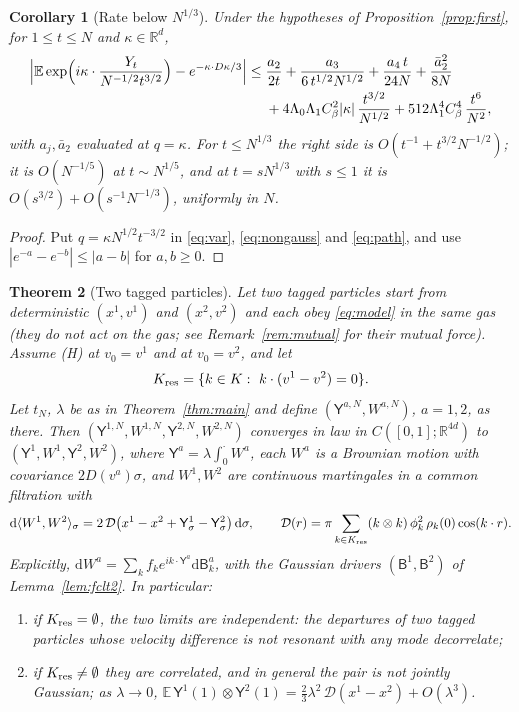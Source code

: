 \documentclass[11pt]{article}
\newcommand{\dd}{\mathrm{d}}
\newcommand{\E}{\mathbb{E}}
\newcommand{\R}{\mathbb{R}}
\newcommand{\sY}{\mathsf{Y}}
\newcommand{\sB}{\mathsf{B}}
\newtheorem{theorem}{Theorem}
\newtheorem{corollary}[theorem]{Corollary}
\theoremstyle{remark}
\begin{document}
\begin{corollary}[Rate below $N^{1/3}$]\label{cor:rate}
Under the hypotheses of Proposition~\ref{prop:first}, for $1\le t\le N$ and
$\kappa\in\R^d$,
\begin{align*}
  \Bigl|\E\exp\Bigl(i\kappa\cdot\frac{Y_t}{N^{-1/2}t^{3/2}}\Bigr)
  -e^{-\kappa\cdot D\kappa/3}\Bigr|
  \le{}& \frac{a_2}{2t}+\frac{a_3}{6\,t^{1/2}N^{1/2}}+\frac{a_4\,t}{24N}
  +\frac{\bar a_2^2}{8N}\\
  &+4\Lambda_0\Lambda_1C_\beta^2|\kappa|\,\frac{t^{3/2}}{N^{1/2}}
  +512\Lambda_1^4C_\beta^4\,\frac{t^6}{N^2},
\end{align*}
with $a_j,\bar a_2$ evaluated at $q=\kappa$. For $t\le N^{1/3}$ the right
side is $O(t^{-1}+t^{3/2}N^{-1/2})$; it is $O(N^{-1/5})$ at $t\sim N^{1/5}$,
and at $t=sN^{1/3}$ with $s\le1$ it is $O(s^{3/2})+O(s^{-1}N^{-1/3})$,
uniformly in $N$.
\end{corollary}

\begin{proof}
Put $q=\kappa N^{1/2}t^{-3/2}$ in \eqref{eq:var}, \eqref{eq:nongauss} and
\eqref{eq:path}, and use $|e^{-a}-e^{-b}|\le|a-b|$ for $a,b\ge0$.
\end{proof}

\begin{theorem}[Two tagged particles]\label{thm:two}
Let two tagged particles start from deterministic $(x^1,v^1)$ and
$(x^2,v^2)$ and each obey \eqref{eq:model} in the same gas (they do not act
on the gas; see Remark~\ref{rem:mutual} for their mutual force). Assume
\textup{(H)} at $v_0=v^1$ and at $v_0=v^2$, and let
\[
  K_{\rm res}=\{k\in K:\ k\cdot(v^1-v^2)=0\}.
\]
Let $t_N$, $\lambda$ be as in Theorem~\ref{thm:main} and define
$(\sY^{a,N},W^{a,N})$, $a=1,2$, as there. Then
$(\sY^{1,N},W^{1,N},\sY^{2,N},W^{2,N})$ converges in law in
$C([0,1];\R^{4d})$ to $(\sY^1,W^1,\sY^2,W^2)$, where
$\sY^a=\lambda\int_0^\cdot W^a$, each $W^a$ is a Brownian motion with
covariance $2D(v^a)\sigma$, and $W^1,W^2$ are continuous martingales in a
common filtration with
\begin{equation}
  \dd\langle W^1,W^2\rangle_\sigma
  =2\,\mathcal{D}\bigl(x^1-x^2+\sY^1_\sigma-\sY^2_\sigma\bigr)\,\dd\sigma,
  \qquad
  \mathcal{D}(r)=\pi\sum_{k\in K_{\rm res}}(k\otimes k)\,\phi_k^2\,
  \rho_k(0)\cos(k\cdot r).
  \label{eq:twopoint}
\end{equation}
Explicitly, $\dd W^a=\sum_kf_ke^{ik\cdot\sY^a}\dd\sB^a_k$, with the Gaussian
drivers $(\sB^1,\sB^2)$ of Lemma~\ref{lem:fclt2}. In particular:
\begin{enumerate}
  \item if $K_{\rm res}=\emptyset$, the two limits are independent: the
    departures of two tagged particles whose velocity difference is not
    resonant with any mode decorrelate;
  \item if $K_{\rm res}\ne\emptyset$ they are correlated, and in general the
    pair is not jointly Gaussian; as $\lambda\to0$,
    $\E\,\sY^1(1)\otimes\sY^2(1)
    =\tfrac23\lambda^2\,\mathcal{D}(x^1-x^2)+O(\lambda^3)$.
\end{enumerate}
\end{theorem}
\end{document}
